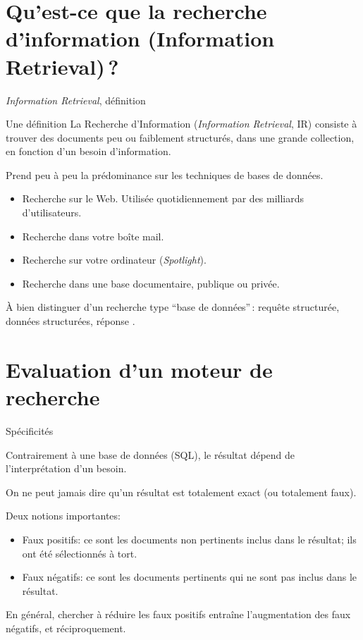 \section{Qu'est-ce que la recherche d'information (Information Retrieval)\,?}

\begin{frame}{\textit{Information Retrieval}, définition}

\begin{block}{Une définition}
La \alert{Recherche d'Information} (\textit{Information Retrieval}, IR) consiste à
trouver des \alert{documents} peu ou faiblement structurés, dans une grande \alert{collection},
en fonction d'un \alert{besoin d'information}.
\end{block}

Prend peu à peu la prédominance sur les techniques de bases de données.

\begin{itemize} 
  \item Recherche sur le Web. Utilisée quotidiennement par des milliards d'utilisateurs.
   \item Recherche dans votre boîte mail.
   \item Recherche sur votre ordinateur (\textit{Spotlight}).
    \item Recherche dans une base documentaire, publique ou privée.
\end{itemize}

À bien distinguer d'un recherche type ``base de données''\,: requête structurée, données structurées,
réponse .
\end{frame}

\section{Evaluation d'un moteur de recherche}

\begin{frame}{Spécificités}

Contrairement à une base de données (SQL), le résultat dépend de \alert{l'interprétation}
d'un besoin.

\vfill

On ne peut jamais dire qu'un résultat est totalement exact (ou totalement faux).

\vfill

Deux notions importantes:

\begin{itemize}
  \item \alert{Faux positifs}: ce sont les documents \alert{non pertinents} inclus dans le résultat;
    ils ont été sélectionnés à tort.
  \item \alert{Faux négatifs}: ce sont les documents \alert{pertinents} qui \alert{ne sont pas}
    inclus dans le résultat. 
\end{itemize}

\vfill

En général, chercher à réduire les faux positifs entraîne l'augmentation des faux négatifs, 
et réciproquement. 

\end{frame}

